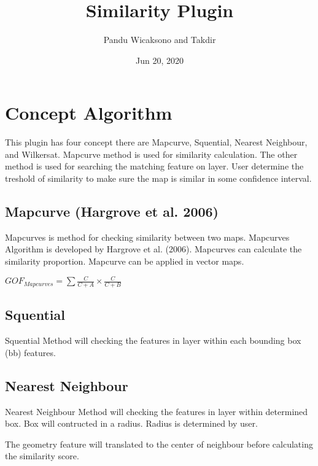 \documentclass[letterpaper,10pt,english]{sphinxmanual}
\title{Similarity Plugin}
\date{Jun 20, 2020}
\author{Pandu Wicaksono and Takdir}
\let\sphinxpxdimen\pdfpxdimen\else\newdimen\sphinxpxdimen
\begin{document}
\pagestyle{empty}
\sphinxmaketitle
\pagestyle{plain}
\sphinxtableofcontents
\pagestyle{normal}
\label{\detokenize{index::doc}}



\chapter{Concept Algorithm}
\label{\detokenize{concept:concept-algorithm}}\label{\detokenize{concept::doc}}
This plugin has four concept there are Mapcurve, Squential, Nearest Neighbour, and Wilkersat. Mapcurve method is used for similarity calculation. The other method is used for searching the matching feature on layer. User determine the treshold of similarity to make sure the map is similar in some confidence interval.


\section{Mapcurve (Hargrove et al. 2006)}
\label{\detokenize{concept:mapcurve-hargrove-et-al-2006}}
Mapcurves is method for checking similarity between two maps. Mapcurves Algorithm is developed by Hargrove et al. (2006). Mapcurves can calculate the similarity proportion. Mapcurve can be applied in vector maps.

\(GOF_{Mapcurves} = \sum{\frac{C}{C+A} \times \frac{C}{C+B}}\)


\section{Squential}
\label{\detokenize{concept:squential}}
Squential Method will checking the features in layer within each bounding box (bb) features.

\noindent\sphinxincludegraphics[width=400\sphinxpxdimen]{{squential}.png}


\section{Nearest Neighbour}
\label{\detokenize{concept:nearest-neighbour}}
Nearest Neighbour Method will checking the features in layer within determined box. Box will contructed in a radius. Radius is determined by user.

\noindent\sphinxincludegraphics[width=400\sphinxpxdimen]{{nn}.png}

The geometry feature will translated to the center of neighbour before calculating the similarity score.
\end{document}
